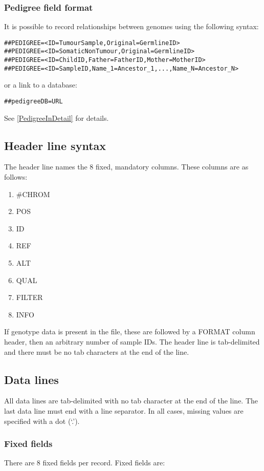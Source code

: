 \documentclass[8pt]{article}
\begin{document}
\subsubsection{Pedigree field format}
It is possible to record relationships between genomes using the following syntax:
\begin{verbatim}
##PEDIGREE=<ID=TumourSample,Original=GermlineID>
##PEDIGREE=<ID=SomaticNonTumour,Original=GermlineID>
##PEDIGREE=<ID=ChildID,Father=FatherID,Mother=MotherID>
##PEDIGREE=<ID=SampleID,Name_1=Ancestor_1,...,Name_N=Ancestor_N>
\end{verbatim}
\noindent or a link to a database:
\begin{verbatim}
##pedigreeDB=URL
\end{verbatim}

\noindent See \ref{PedigreeInDetail} for details.


\subsection{Header line syntax}
The header line names the 8 fixed, mandatory columns. These columns are as follows:

\begin{enumerate}
  \item \#CHROM
  \item POS
  \item ID
  \item REF
  \item ALT
  \item QUAL
  \item FILTER
  \item INFO
\end{enumerate}

If genotype data is present in the file, these are followed by a FORMAT column header, then an arbitrary number of sample IDs. The header line is tab-delimited
and there must be no tab characters at the end of the line.

\subsection{Data lines}
All data lines are tab-delimited
with no tab character at the end of the line. The last data line must end with a line separator. In all cases,
missing values are specified with a dot (`.').

\subsubsection{Fixed fields}
There are 8 fixed fields per record.  Fixed fields are:
\end{document}
